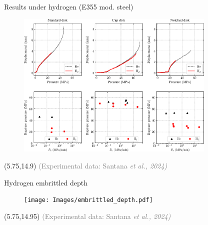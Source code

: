 \documentclass[9pt]{beamer}
\begin{document}
\begin{frame}{Results under hydrogen (E355 mod. steel)}

\begin{figure}
	\centering
	\includegraphics[width=0.85\textwidth]{Images/H2_results_E355.pdf} \\
\end{figure}

    \begin{textblock}{6}(5.75,14.9)
        \textcolor{gray}{\scriptsize (Experimental data: Santana \textit{et al., 2024)}}
    \end{textblock}

\end{frame}


\begin{frame}{Hydrogen embrittled depth}

\begin{figure}
	\centering
	\texttt{[image: Images/embrittled\_depth.pdf]} \\
\end{figure}

    \begin{textblock}{6}(5.75,14.95)
        \textcolor{gray}{\scriptsize (Experimental data: Santana \textit{et al., 2024)}}
    \end{textblock}

\end{frame}

\end{document}

